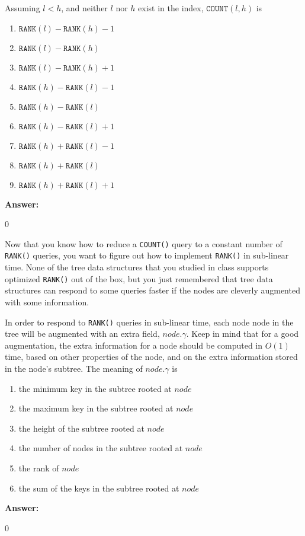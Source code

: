 \documentclass[12pt,twoside]{article}
\newcommand{\answer}{
 \par\medskip
 \textbf{Answer:}
}
\newcommand{\answerIh}{ \answer
0
}
\newcommand{\answerIi}{ \answer
0
}
\begin{document}
\begin{problems}
\begin{problemparts}
  \problempart {} Assuming $l < h$, and neither $l$ nor $h$ exist in the
  index, $\texttt{COUNT}(l, h)$ is
    \begin{enumerate}
      \item $\texttt{RANK}(l)-\texttt{RANK}(h)-1$
      \item $\texttt{RANK}(l)-\texttt{RANK}(h)$
      \item $\texttt{RANK}(l)-\texttt{RANK}(h)+1$
      \item $\texttt{RANK}(h)-\texttt{RANK}(l)-1$
      \item $\texttt{RANK}(h)-\texttt{RANK}(l)$
      \item $\texttt{RANK}(h)-\texttt{RANK}(l)+1$
      \item $\texttt{RANK}(h)+\texttt{RANK}(l)-1$
      \item $\texttt{RANK}(h)+\texttt{RANK}(l)$
      \item $\texttt{RANK}(h)+\texttt{RANK}(l)+1$
    \end{enumerate}
\answerIh

\end{problemparts}

Now that you know how to reduce a \texttt{COUNT()} query to a constant number of
\texttt{RANK()} queries, you want to figure out how to implement \texttt{RANK()} in
sub-linear time. None of the tree data structures that you studied in class supports
optimized \texttt{RANK()} out of the box, but you just remembered that tree data
structures can respond to some queries faster if the nodes are cleverly augmented
with some information.

\begin{problemparts}

  \problempart {} In order to respond to \texttt{RANK()} queries in 
  sub-linear time, each node node in the tree will be augmented with an extra field,
  $node.\gamma$. Keep in mind that for a good augmentation, the extra information for
  a node should be computed in $O(1)$ time, based on other properties of the node,
  and on the extra information stored in the node’s subtree. The meaning of 
  $node.\gamma$ is
    \begin{enumerate}
      \item the minimum key in the subtree rooted at $node$
      \item the maximum key in the subtree rooted at $node$
      \item the height of the subtree rooted at $node$
      \item the number of nodes in the subtree rooted at $node$
      \item the rank of $node$
      \item the sum of the keys in the subtree rooted at $node$
    \end{enumerate}
\answerIi


\end{problemparts}
\end{problems}
\end{document}
